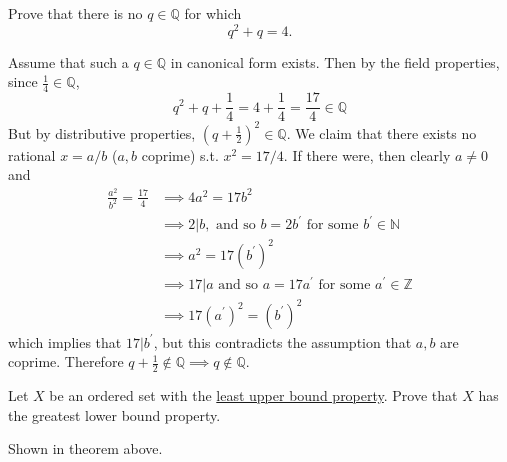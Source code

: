   \begin{exercise}
    Prove that there is no $q \in \mathbb{Q}$ for which
    \begin{equation}
      q^2 + q = 4.
    \end{equation}
  \end{exercise}
  \begin{solution}
    Assume that such a $q \in \mathbb{Q}$ in canonical form exists. Then by the field properties, since $\frac{1}{4} \in \mathbb{Q}$, 
    \begin{equation}
      q^2 + q + \frac{1}{4} = 4 + \frac{1}{4} = \frac{17}{4} \in \mathbb{Q}
    \end{equation}
    But by distributive properties, $(q + \frac{1}{2})^2 \in \mathbb{Q}$. We claim that there exists no rational $x = a/b$ ($a, b$ coprime) s.t. $x^2 = 17/4$. If there were, then clearly $a \neq 0$ and 
    \begin{align}
      \frac{a^2}{b^2} = \frac{17}{4} & \implies 4a^2 = 17 b^2 \\
                                     & \implies 2 | b, \text{ and so } b = 2b^\prime \text{ for some } b^\prime \in \mathbb{N} \\
                                     & \implies a^2 = 17 (b^\prime)^2 \\ 
                                     & \implies 17 | a \text{ and so } a = 17 a^\prime \text{ for some } a^\prime \in \mathbb{Z} \\
                                     & \implies 17 (a^\prime)^2 = (b^\prime)^2
    \end{align}
    which implies that $17|b^\prime$, but this contradicts the assumption that $a, b$ are coprime. Therefore $q + \frac{1}{2} \not\in \mathbb{Q} \implies q \not\in \mathbb{Q}$. 
  \end{solution}

  \begin{exercise}
    Let $X$ be an ordered set with the \hyperref[def:least-upper-bound-property]{least upper bound property}. Prove that $X$ has the greatest lower bound property.
  \end{exercise}
  \begin{solution}
    Shown in theorem above. 
  \end{solution}

